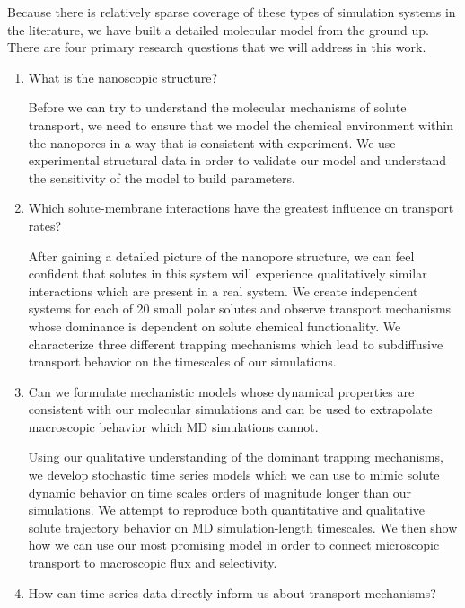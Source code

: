   Because there is relatively sparse coverage of these types of simulation systems in 
  the literature, we have built a detailed molecular model from the ground up. There 
  are four primary research questions that we will address in this work.
  \begin{enumerate}
    \item What is the nanoscopic structure?

    	  Before we can try to understand the molecular mechanisms of solute
    	  transport, we need to ensure that we model the chemical environment
    	  within the nanopores in a way that is consistent with experiment.
    	  We use experimental structural data in order to validate our model and
    	  understand the sensitivity of the model to build parameters.

    \item Which solute-membrane interactions have the greatest influence on transport rates?
    	  
    	  After gaining a detailed picture of the nanopore structure, we can 
    	  feel confident that solutes in this system will experience qualitatively 
    	  similar interactions which are present in a real system. We create independent
    	  systems for each of 20 small polar solutes and observe transport mechanisms
    	  whose dominance is dependent on solute chemical functionality. We characterize
    	  three different trapping mechanisms which lead to subdiffusive transport behavior
    	  on the timescales of our simulations.
    	  
    \item Can we formulate mechanistic models whose dynamical properties are consistent with our
    molecular simulations and can be used to extrapolate macroscopic behavior which MD simulations cannot.

		  Using our qualitative understanding of the dominant trapping mechanisms,
    	  we develop stochastic time series models which we can use to mimic solute dynamic
    	  behavior on time scales orders of magnitude longer than our simulations. 
    	  We attempt to reproduce both quantitative and qualitative solute trajectory
    	  behavior on MD simulation-length timescales. We then show how we can use our 
    	  most promising model in order to connect microscopic transport to macroscopic
    	  flux and selectivity.

    \item How can time series data directly inform us about transport mechanisms?
    	

\end{enumerate}
